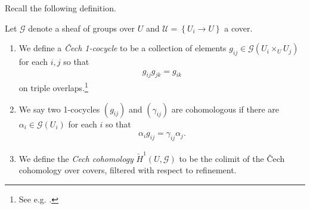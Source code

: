 \documentclass[11pt,openany]{book}
\begin{document}
Recall the following definition.

\begin{definition}\label{def:cech-cover-cohomology} 
Let $\mathcal{G}$ denote a sheaf of groups over $U$ and $\mathcal{U} = \left\{ U_i \to U \right\}$ a cover.
\begin{enumerate}
    \item We define a \textit{\v{C}ech 1-cocycle} to be a collection of elements $g_{ij} \in \mathcal{G}(U_i \times_U U_j)$ for each $i,j$ so that
\begin{align*}
    g_{ij}g_{jk} = g_{ik}
\end{align*}
on triple overlaps.\footnote{See e.g. \cite[\S11]{MilneLEC}.}
    \item We say two 1-cocycles $(g_{ij})$ and $(\gamma_{ij})$ are cohomologous if there are $\alpha_i \in \mathcal{G}(U_i)$ for each $i$ so that
    \begin{align*}
        \alpha_i g_{ij} = \gamma_{ij} \alpha_j.
    \end{align*}
    \item We define the \textit{Cech cohomology} $\check{H}^1(U,\mathcal{G})$ to be the colimit of the \v{C}ech cohomology over covers, filtered with respect to refinement.
\end{enumerate}
\end{definition}
\end{document}
